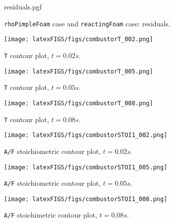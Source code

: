    \newpage

    \setcounter{lastPage}{\thepage}
    \setcounter{page}{1}
    \renewcommand{\thepage}{REA-\roman{page}}

    \begin{figure}[!h]
        \centering
        {residuals.pgf}
        \cprotect\caption{\verb|rhoPimpleFoam| case and \verb|reactingFoam| case: residuals.}
    \end{figure}
    
    \begin{figure}[!ht]
        \centering
        \texttt{[image: latexFIGS/figs/combustorT\_002.png]}
        \cprotect\caption{\verb|T| contour plot, $t = 0.02s$.}
    \end{figure}
    
    \begin{figure}[!h]
        \centering
        \texttt{[image: latexFIGS/figs/combustorT\_005.png]}
        \cprotect\caption{\verb|T| contour plot, $t = 0.05s$.}
    \end{figure}
    
    \begin{figure}[!hb]
        \centering
        \texttt{[image: latexFIGS/figs/combustorT\_008.png]}
        \cprotect\caption{\verb|T| contour plot, $t = 0.08s$.}
    \end{figure}

    \begin{figure}[!ht]
        \centering
        \texttt{[image: latexFIGS/figs/combustorSTOI1\_002.png]}
        \cprotect\caption{\verb|A/F| stoichiometric contour plot, $t = 0.02s$.}
    \end{figure}
    
    \begin{figure}[!h]
        \centering
        \texttt{[image: latexFIGS/figs/combustorSTOI1\_005.png]}
        \cprotect\caption{\verb|A/F| stoichiometric contour plot, $t = 0.05s$.}
    \end{figure}
    
    \begin{figure}[!hb]
        \centering
        \texttt{[image: latexFIGS/figs/combustorSTOI1\_008.png]}
        \cprotect\caption{\verb|A/F| stoichimetric contour plot, $t = 0.08s$.}
    \end{figure}
    \clearpage
